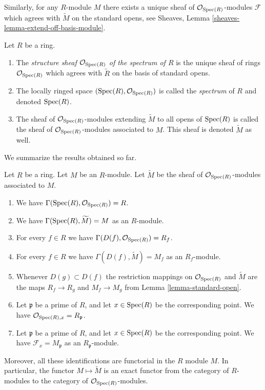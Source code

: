 \medskip\noindent
Similarly, for any $R$-module $M$ there exists
a unique sheaf of $\mathcal{O}_{\mathop{\rm Spec}(R)}$-modules
$\mathcal{F}$ which agrees with $\widetilde M$ on the
standard opens, see
Sheaves, Lemma \ref{sheaves-lemma-extend-off-basis-module}.

\begin{definition}
\label{definition-structure-sheaf}
Let $R$ be a ring.
\begin{enumerate}
\item The {\it structure sheaf $\mathcal{O}_{\mathop{\rm Spec}(R)}$ of the
spectrum of $R$} is the unique sheaf of rings $\mathcal{O}_{\mathop{\rm Spec}(R)}$
which agrees with $\widetilde R$ on the basis of standard opens.
\item The locally ringed space
$(\mathop{\rm Spec}(R), \mathcal{O}_{\mathop{\rm Spec}(R)})$ is called
the {\it spectrum} of $R$ and denoted $\mathop{\rm Spec}(R)$.
\item The sheaf of $\mathcal{O}_{\mathop{\rm Spec}(R)}$-modules
extending $\widetilde M$ to all opens of $\mathop{\rm Spec}(R)$
is called the sheaf of $\mathcal{O}_{\mathop{\rm Spec}(R)}$-modules
associated to $M$. This sheaf is denoted $\widetilde M$ as
well.
\end{enumerate}
\end{definition}

\noindent
We summarize the results obtained so far.

\begin{lemma}
\label{lemma-spec-sheaves}
Let $R$ be a ring. Let $M$ be an $R$-module. Let $\widetilde M$
be the sheaf of $\mathcal{O}_{\mathop{\rm Spec}(R)}$-modules
associated to $M$.
\begin{enumerate}
\item We have $\Gamma(\mathop{\rm Spec}(R), \mathcal{O}_{\mathop{\rm Spec}(R)}) = R$.
\item We have $\Gamma(\mathop{\rm Spec}(R), \widetilde M) = M$ as an $R$-module.
\item For every $f \in R$ we have
$\Gamma(D(f), \mathcal{O}_{\mathop{\rm Spec}(R)}) = R_f$.
\item For every $f\in R$ we have $\Gamma(D(f), \widetilde M) = M_f$
as an $R_f$-module.
\item Whenever $D(g) \subset D(f)$ the restriction mappings
on $\mathcal{O}_{\mathop{\rm Spec}(R)}$ and $\widetilde M$
are the maps
$R_f \to R_g$ and $M_f \to M_g$ from Lemma
\ref{lemma-standard-open}.
\item Let $\mathfrak p$ be a prime of $R$, and let $x \in \mathop{\rm Spec}(R)$
be the corresponding point. We have
$\mathcal{O}_{\mathop{\rm Spec}(R), x} = R_{\mathfrak p}$.
\item Let $\mathfrak p$ be a prime of $R$, and let $x \in \mathop{\rm Spec}(R)$
be the corresponding point. We have $\mathcal{F}_x = M_{\mathfrak p}$
as an $R_{\mathfrak p}$-module.
\end{enumerate}
Moreover, all these identifications are functorial in the $R$
module $M$. In particular, the functor $M \mapsto \widetilde M$
is an exact functor from the category of $R$-modules
to the category of $\mathcal{O}_{\mathop{\rm Spec}(R)}$-modules.
\end{lemma}

